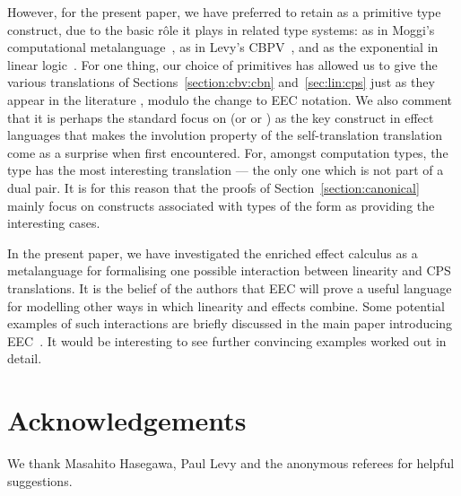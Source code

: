 \documentclass{LMCS}
\begin{document}
However, for the present paper, we have preferred to retain 
as a primitive type construct, due to the basic r\^{o}le it plays in
related type systems: as  in Moggi's computational metalanguage~\cite{Moggi:91},
as  in Levy's CBPV~\cite{Levy:book}, and as the exponential in
linear logic~\cite{Girard:87}. For one thing, our choice of primitives
has allowed us to give the various translations of 
Sections~\ref{section:cbv:cbn} and~\ref{sec:lin:cps}
just as they appear in the literature
\cite{Moggi:91,Filinski:phd,Levy:book,Hasegawa:Flops:02,Hasegawa:Flops:04},
modulo the change  to EEC notation.
We also comment that it is perhaps the standard focus on 
 (or  or ) as the key construct in effect languages
that makes the involution property of the self-translation translation 
come as a surprise when first encountered. For, amongst computation types,
the type  has the most interesting translation --- the only one which
is not part of a dual pair. It is for this reason that the proofs of
Section~\ref{section:canonical} mainly focus on constructs associated with types of the form
 as providing  the interesting cases.

In the present paper, we have  investigated the enriched effect calculus  as a metalanguage for 
formalising one possible interaction between linearity and CPS translations.
It is the belief of the authors that EEC will prove
a useful language for modelling other ways in which linearity
and effects combine. Some potential examples of such interactions
are briefly discussed in the main paper introducing EEC~\cite{EMSb}. 
It would be interesting to see further convincing examples worked out
in detail.

\section*{Acknowledgements} 
We thank Masahito Hasegawa, Paul Levy and 
the anonymous referees for helpful suggestions.


\end{document}
